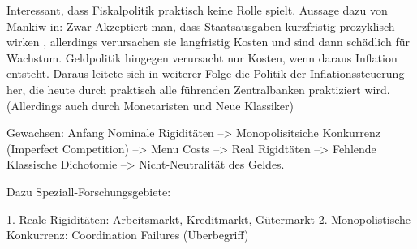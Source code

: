 Interessant, dass Fiskalpolitik praktisch keine Rolle spielt. Aussage dazu von Mankiw in: \parencite[S. 446]{Snowdon2005} Zwar Akzeptiert man, dass Staatsausgaben kurzfristig prozyklisch wirken \parencite[S. 408]{Snowdon2005}, allerdings verursachen sie langfristig Kosten und sind dann schädlich für Wachstum. Geldpolitik hingegen verursacht nur Kosten, wenn daraus Inflation entsteht. Daraus leitete sich in weiterer Folge \parencite[S. 413]{Snowdon2005} die Politik der Inflationssteuerung her, die heute durch praktisch alle führenden Zentralbanken praktiziert wird. (Allerdings auch durch Monetaristen und Neue Klassiker)

Gewachsen: Anfang Nominale Rigiditäten --> Monopolisitsiche Konkurrenz (Imperfect Competition) --> Menu Costs --> Real Rigidtäten --> Fehlende Klassische Dichotomie --> Nicht-Neutralität des Geldes.

Dazu Speziall-Forschungsgebiete: 

1. Reale Rigiditäten: Arbeitsmarkt, Kreditmarkt, Gütermarkt
2. Monopolistische Konkurrenz: Coordination Failures (Überbegriff)
